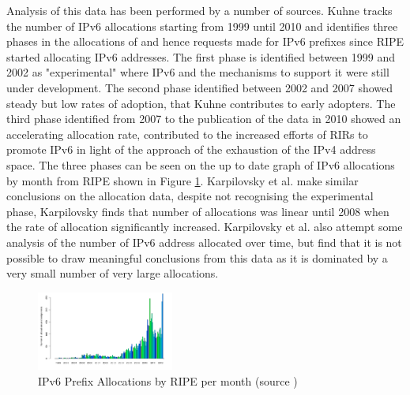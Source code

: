 Analysis of this data has been performed by a number of sources. Kuhne tracks
the number of IPv6 allocations starting from 1999 until 2010 and identifies three
phases in the allocations of and hence requests made for IPv6 prefixes since
RIPE started allocating IPv6 addresses\cite{kuhne_interesting_2010}.
The first phase is identified between 1999 and
2002 as "experimental" where IPv6 and the mechanisms to support it were still
under development. The second phase identified between 2002 and 2007 showed
steady but low rates of adoption, that Kuhne contributes to early adopters. The
third phase identified from 2007 to the publication of the data in 2010 showed
an accelerating allocation rate, contributed to the increased efforts of RIRs
to promote IPv6 in light of the approach of the exhaustion of the IPv4 address
space. The three phases can be seen on the up to date graph of IPv6 allocations
by month from RIPE shown in Figure \ref{fig:alloc-month}. Karpilovsky et al. make
similar conclusions on the allocation data, despite not recognising the
experimental phase, Karpilovsky finds that number of allocations was linear
until 2008 when the rate of allocation significantly increased\cite{karpilovsky_quantifying_2009}.
Karpilovsky et
al. also attempt some analysis of the number of IPv6 address allocated over
time, but find that it is not possible to draw meaningful conclusions from this
data as it is dominated by a very small number of very large allocations.

\begin{figure}[htb]
\centering
\includegraphics[width=0.4\textwidth]{img/v6-alloc-month.png}
\caption{IPv6 Prefix Allocations by RIPE per month (source \protect\cite{ripe_ncc_ipv6_2013})}
\label{fig:alloc-month}
\end{figure}

